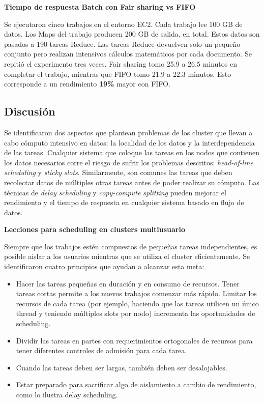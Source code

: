 \begin{center}
	\textbf{Tiempo de respuesta Batch con Fair sharing vs FIFO}
\end{center}

Se ejecutaron cinco trabajos en el entorno EC2. Cada trabajo lee 100 GB de datos. Los Maps del trabajo producen 200 GB de salida, en total. Estos datos son pasados a 190 tareas Reduce. Las tareas Reduce devuelven solo un pequeño conjunto pero realizan intensivos cálculos matemáticos por cada documento. Se repitió el experimento tres veces. Fair sharing tomo 25.9 a 26.5 minutos en completar el trabajo, mientras que FIFO tomo 21.9 a 22.3 minutos. Esto corresponde a un rendimiento \textbf{19\%} mayor con FIFO.


\subsection{Discusión}

Se identificaron dos aspectos que plantean problemas de los cluster que llevan a cabo cómputo intensivo en datos: la localidad de los datos y la interdependencia de las tareas. Cualquier sistema que coloque las tareas en los nodos que contienen los datos necesarios corre el riesgo de sufrir los problemas descritos: \textit{head-of-line scheduling} y \textit{sticky slots}. Similarmente, son comunes las tareas que deben recolectar datos de múltiples otras tareas antes de poder realizar su cómputo. Las técnicas de \textit{delay scheduling} y \textit{copy-compute splitting} pueden mejorar el rendimiento y el tiempo de respuesta en cualquier sistema basado en flujo de datos.\\

\begin{center}
	\textbf{Lecciones para scheduling en clusters multiusuario}
\end{center}

Siempre que los trabajos estén compuestos de pequeñas tareas independientes, es posible aislar a los usuarios mientras que se utiliza el cluster eficientemente. Se identificaron cuatro principios que ayudan a alcanzar esta meta:
\begin{itemize}
	\item Hacer las tareas pequeñas en duración y en consumo de recursos. Tener tareas cortas permite a los nuevos trabajos comenzar más rápido. Limitar los recursos de cada tarea (por ejemplo, haciendo que las tareas utilicen un único thread y teniendo múltiples slots por nodo) incrementa las oportunidades de scheduling.
	\item Dividir las tareas en partes con requerimientos ortogonales de recursos para tener diferentes controles de admisión para cada tarea.
	\item Cuando las tareas deben ser largas, también deben ser desalojables.
	\item Estar preparado para sacrificar algo de aislamiento a cambio de rendimiento, como lo ilustra delay scheduling.
\end{itemize}


